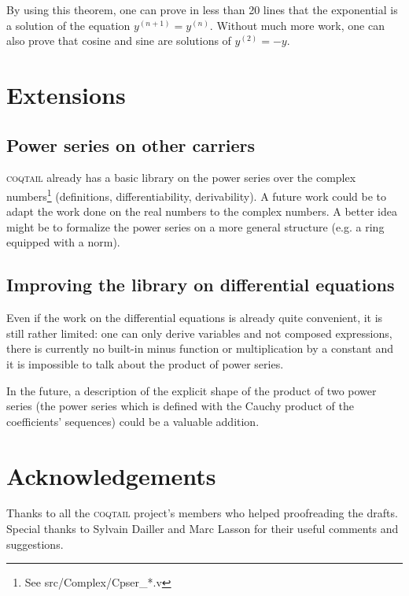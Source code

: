 \documentclass[submission,copyright]{eptcs}
\newcommand{\coqtail}{\textsc{coqtail}}
\begin{document}
By using this theorem, one can prove in less than 20 lines that the
exponential is a solution of the equation $y^{(n+1)} = y^{(n)}$. Without
much more work, one can also prove that cosine and sine are solutions
of $y^{(2)} = - y$.

\section{Extensions}

\subsection{Power series on other carriers}

\coqtail{} already has a basic library on the power series over the complex
numbers\footnote{See src/Complex/Cpser\_*.v} (definitions, differentiability,
derivability). A future work could be to adapt the work done on the real
numbers to the complex numbers. A better idea might be to formalize the
power series on a more general structure (e.g. a ring equipped with a norm).

\subsection{Improving the library on differential equations}

Even if the work on the differential equations is already quite
convenient, it is still rather limited: one can only derive variables
and not composed expressions, there is currently no built-in minus
function or multiplication by a constant and it is impossible to talk
about the product of power series.

In the future, a description of the explicit shape of the product of two
power series (the power series which is defined with the Cauchy product
of the coefficients' sequences) could be a valuable addition.

\nocite{*}



\section{Acknowledgements}

Thanks to all the \coqtail{} project's members who helped proofreading the
drafts. Special thanks to Sylvain Dailler and Marc Lasson for their useful
comments and suggestions.
\end{document}
